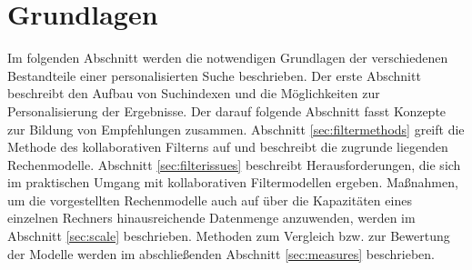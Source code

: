 \section{Grundlagen}\label{sec:basics} %

Im folgenden Abschnitt werden die notwendigen Grundlagen der verschiedenen Bestandteile einer personalisierten Suche beschrieben. Der erste Abschnitt beschreibt den Aufbau von Suchindexen und die Möglichkeiten zur Personalisierung der Ergebnisse. Der darauf folgende Abschnitt fasst Konzepte zur Bildung von Empfehlungen zusammen. Abschnitt \ref{sec:filtermethods} greift die Methode des kollaborativen Filterns auf und beschreibt die zugrunde liegenden Rechenmodelle. Abschnitt \ref{sec:filterissues} beschreibt Herausforderungen, die sich im praktischen Umgang mit kollaborativen Filtermodellen ergeben. Maßnahmen, um die vorgestellten Rechenmodelle auch auf über die Kapazitäten eines einzelnen Rechners hinausreichende Datenmenge anzuwenden, werden im Abschnitt \ref{sec:scale} beschrieben. Methoden zum Vergleich bzw. zur Bewertung der Modelle werden im abschließenden Abschnitt \ref{sec:measures}  beschrieben.







